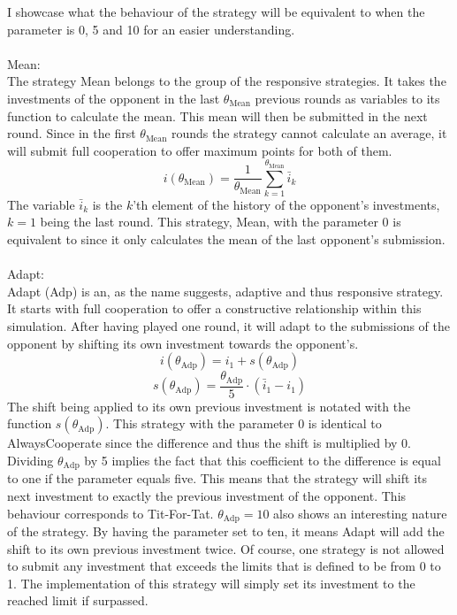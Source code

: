 \documentclass{article}
\begin{document}
\begin{itemize}
I showcase what the behaviour of the strategy will be equivalent to when the parameter is 0, 5 and 10 for an easier understanding.\\
		\\Mean:\\
The strategy Mean belongs to the group of the responsive strategies.
It takes the investments of the opponent in the last $\theta_{\mathrm{Mean}}$ previous rounds as variables to its function to calculate the mean.
This mean will then be submitted in the next round.
Since in the first $\theta_{\mathrm{Mean}}$ rounds the strategy cannot calculate an average, it will submit full cooperation to offer maximum points for both of them.
$$i(\theta_{\mathrm{Mean}}) = \frac{1}{\theta_{\mathrm{Mean}}}\sum_{k=1}^{\theta_{\mathrm{Mean}}}\bar i_k$$
The variable $\bar i_k$ is the $k$'th element of the history of the opponent's investments, $k = 1$ being the last round.
This strategy, Mean, with the parameter 0 is equivalent to  since it only calculates the mean of the last opponent's submission.\\
		\\Adapt:\\
Adapt (Adp) is an, as the name suggests, adaptive and thus responsive strategy.
It starts with full cooperation to offer a constructive relationship within this simulation.
After having played one round, it will adapt to the submissions of the opponent by shifting its own investment towards the opponent's.
$$i(\theta_{\mathrm{Adp}}) = i_1 + s(\theta_{\mathrm{Adp}})$$
$$s(\theta_{\mathrm{Adp}}) = \frac{\theta_{\mathrm{Adp}}}{5} \cdot (\bar i_1 - i_1)$$
The shift being applied to its own previous investment is notated with the function $s(\theta_{\mathrm{Adp}})$.
This strategy with the parameter 0 is identical to AlwaysCooperate since the difference and thus the shift is multiplied by 0.
Dividing $\theta_{\mathrm{Adp}}$ by 5 implies the fact that this coefficient to the difference is equal to one if the parameter equals five.
This means that the strategy will shift its next investment to exactly the previous investment of the opponent.
This behaviour corresponds to Tit-For-Tat.
$\theta_{\mathrm{Adp}} = 10$ also shows an interesting nature of the strategy.
By having the parameter set to ten, it means Adapt will add the shift to its own previous investment twice.
Of course, one strategy is not allowed to submit any investment that exceeds the limits that is defined to be from 0 to 1.
The implementation of this strategy will simply set its investment to the reached limit if surpassed.\\

\end{itemize}
\end{document}
